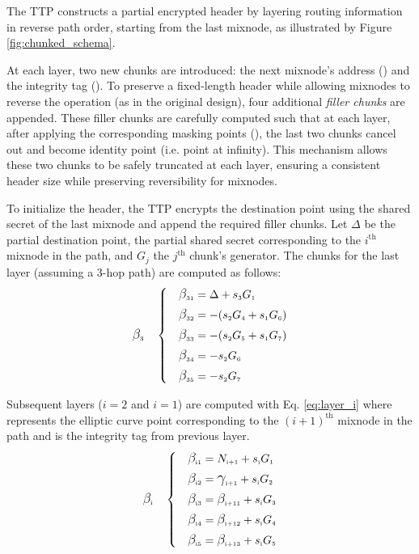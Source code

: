 The TTP constructs a partial encrypted header by layering routing information in reverse path order, starting from the last mixnode, as illustrated by Figure \ref{fig:chunked_schema}.

At each layer, two new chunks are introduced: the next mixnode’s  address () and the integrity tag ().  
To preserve a fixed-length header while allowing mixnodes to reverse the operation (as in the original design), four additional \emph{filler chunks} are appended.  
These filler chunks are carefully computed such that at each layer, after applying the corresponding masking points (\hspace{-1mm}), the last two chunks cancel out and become identity point (i.e. point at infinity).  
This mechanism allows these two chunks to be safely truncated at each layer, ensuring a consistent header size while preserving reversibility for mixnodes.

To initialize the header, the TTP encrypts the destination point using the shared secret of the last mixnode and append the required filler chunks. 
Let $ \Delta $ be the partial destination point,  the partial shared secret corresponding to the $ i^\text{th} $ mixnode in the path, and $ G_j $ the $ j^\text{th} $ chunk's generator. 
The chunks for the last layer (assuming a 3-hop path) are computed as follows:
\begin{equation}
\B{3}{} \quad \left\{ \quad
\begin{aligned}
    \B{3}{1} &= \Delta       + \sG{3}{1} \\
    \B{3}{2} &= - (\sG{2}{4} + \sG{1}{6}) \\
    \B{3}{3} &= - (\sG{2}{5} + \sG{1}{7}) \\
    \B{3}{4} &= - \sG{2}{6} \\
    \B{3}{5} &= - \sG{2}{7} \\
\end{aligned}
\right.
\label{eq:last_layer}
\end{equation}

\noindent
Subsequent layers ($ i = 2 $ and $ i = 1 $) are computed with Eq. \ref{eq:layer_i} where  represents the 
elliptic curve point corresponding to the $ (i+1)^\text{th} $ mixnode in the path and  is the integrity tag from previous layer.
\begin{equation}
\B{i}{} \quad \left\{ \quad
\begin{aligned}
    \B{i}{1} &= \N{i+1} + \sG{i}{1}\\
    \B{i}{2} &= \C{i+1} + \sG{i}{2} \\
    \B{i}{3} &= \B{i+1}{1} + \sG{i}{3} \\
    \B{i}{4} &= \B{i+1}{2} + \sG{i}{4} \\
    \B{i}{5} &= \B{i+1}{3} + \sG{i}{5} \\
\end{aligned}
\right.
\label{eq:layer_i}
\end{equation}

